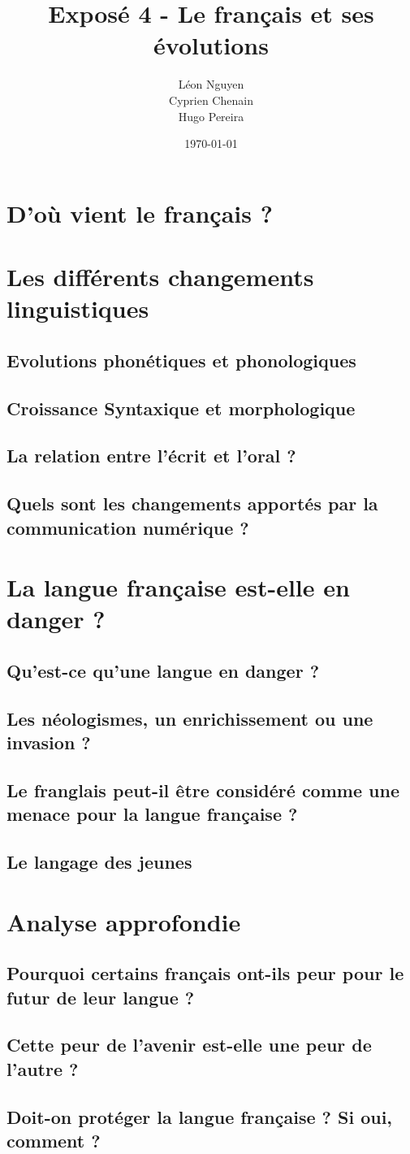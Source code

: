 \documentclass[a4paper,12pt]{article}
\title{Exposé 4 - Le français et ses évolutions}
\author{Léon Nguyen \\ Cyprien Chenain \\ Hugo Pereira}
\date{\today}
\begin{document}
    \titrearticle

    \tableofcontents %

    \section{D'où vient le français ?}

    \section{Les différents changements linguistiques}
    \subsection{Evolutions phonétiques et phonologiques}
    \subsection{Croissance Syntaxique et morphologique}
    \subsection{La relation entre l'écrit et l'oral ?}
    \subsection{Quels sont les changements apportés par la communication numérique ?}

    \section{La langue française est-elle en danger ?}
    \subsection{Qu'est-ce qu'une langue en danger ?}
    \subsection{Les néologismes, un enrichissement ou une invasion ?}
    \subsection{Le franglais peut-il être considéré comme une menace pour la langue française ?}
    \subsection{Le langage des jeunes}

    \section{Analyse approfondie}
    \subsection{Pourquoi certains français ont-ils peur pour le futur de leur langue ?}
    \subsection{Cette peur de l'avenir est-elle une peur de l'autre ?}
    \subsection{Doit-on protéger la langue française ? Si oui, comment ?}
\end{document}

